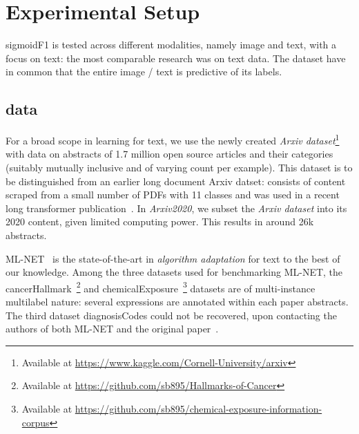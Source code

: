 
\section{Experimental Setup}
\label{sec:orgb44ba25}

sigmoidF1 is tested across different modalities, namely image and text, with a focus on text: the most comparable research was on text data. The dataset have in common that the entire image / text is predictive of its labels.


\subsection{data}


For a broad scope in learning for text, we use the newly created \emph{Arxiv dataset}\footnote{Available at \url{https://www.kaggle.com/Cornell-University/arxiv}} with data on abstracts of 1.7 million open source articles and their categories (suitably mutually inclusive and of varying count per example). This dataset is to be distinguished from an earlier long document Arxiv datset: consists of content scraped from a small number of PDFs with 11 classes \cite{oldArxiv} and was used in a recent long transformer publication~\cite{bigBird}. In \textit{Arxiv2020}, we subset the \emph{Arxiv dataset} into its 2020 content, given limited computing power. This results in around 26k abstracts.


ML-NET~\cite{multitaskLabel} is the state-of-the-art in \emph{algorithm adaptation} for text to the best of our knowledge. Among the three datasets used for benchmarking ML-NET, the cancerHallmark~\cite{cancerHallmarks}\footnote{Available at \url{https://github.com/sb895/Hallmarks-of-Cancer}} and chemicalExposure~\cite{chemExposure}\footnote{Available at \url{https://github.com/sb895/chemical-exposure-information-corpus}} datasets are of multi-instance multilabel nature: several expressions are annotated within each paper abstracts. The third dataset diagnosisCodes could not be recovered, upon contacting the authors of both ML-NET and the original paper~\cite{diagnosisCode}. 

